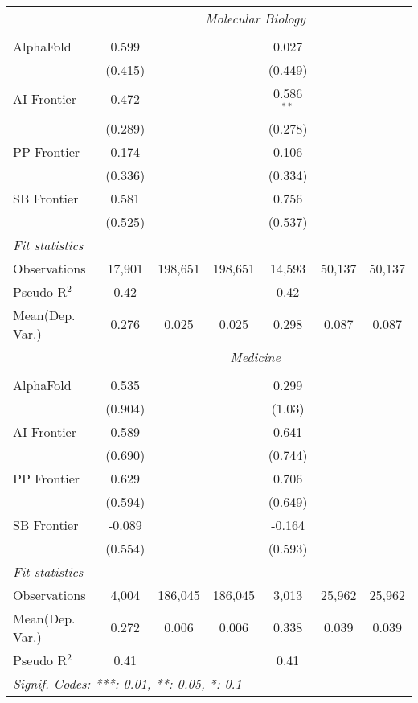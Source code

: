 \begin{tabular}{lcccccc}
 & \multicolumn{6}{c}{\textit{Molecular Biology}} \\ \\
   AlphaFold    & 0.599    &         &         & 0.027        &        &   \\   
                & (0.415)  &         &         & (0.449)      &        &   \\   
   AI Frontier  & 0.472    &         &         & 0.586$^{**}$ &        &   \\   
                & (0.289)  &         &         & (0.278)      &        &   \\   
   PP Frontier  & 0.174    &         &         & 0.106        &        &   \\   
                & (0.336)  &         &         & (0.334)      &        &   \\   
   SB Frontier  & 0.581    &         &         & 0.756        &        &   \\   
                & (0.525)  &         &         & (0.537)      &        &   \\   
   \midrule
   \emph{Fit statistics}\\
   Observations & 17,901   & 198,651 & 198,651 & 14,593       & 50,137 & 50,137\\  
   Pseudo R$^2$ & 0.42     &         &         & 0.42         &        & \\  
   
Mean(Dep. Var.) & 0.276 & 0.025 & 0.025 & 0.298 & 0.087 & 0.087 \\
 & \multicolumn{6}{c}{\textit{Medicine}} \\ \\
   AlphaFold    & 0.535    &         &         & 0.299   &        &   \\   
                & (0.904)  &         &         & (1.03)  &        &   \\   
   AI Frontier  & 0.589    &         &         & 0.641   &        &   \\   
                & (0.690)  &         &         & (0.744) &        &   \\   
   PP Frontier  & 0.629    &         &         & 0.706   &        &   \\   
                & (0.594)  &         &         & (0.649) &        &   \\   
   SB Frontier  & -0.089   &         &         & -0.164  &        &   \\   
                & (0.554)  &         &         & (0.593) &        &   \\   
   \midrule
   \emph{Fit statistics}\\
   Observations & 4,004    & 186,045 & 186,045 & 3,013   & 25,962 & 25,962\\  
Mean(Dep. Var.) & 0.272 & 0.006 & 0.006 & 0.338 & 0.039 & 0.039 \\
   Pseudo R$^2$ & 0.41     &         &         & 0.41    &        & \\  
   \midrule \midrule
   \multicolumn{7}{l}{\emph{Signif. Codes: ***: 0.01, **: 0.05, *: 0.1}}\\
\end{tabular}
\par\endgroup
